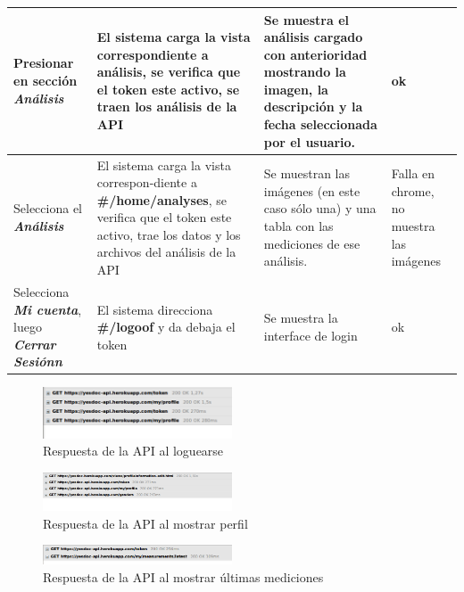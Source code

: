 \documentclass[a4paper,12pt]{article}
\begin{document}
\begin{longtable}{|p{4cm}|p{4cm}|p{4cm}|p{3cm}|}
Presionar en sección \textit{\textbf{Análisis }} 
& El sistema carga la vista correspondiente a análisis, se verifica que el token este activo, se traen los análisis de la API
& Se muestra el análisis cargado con anterioridad mostrando la imagen, la descripción y la fecha seleccionada por el usuario.
& ok
\\ \hline






Selecciona el \textit{\textbf{Análisis}}
& El sistema carga la vista correspon-diente a \textbf{ \#/home/analyses}, se verifica que el token este activo, trae los datos y los archivos del análisis de la API
& Se muestran las imágenes (en este caso sólo una) y una tabla con las mediciones de ese análisis.
& Falla en chrome, no muestra las imágenes
\\ \hline




Selecciona \textit{\textbf{Mi cuenta}}, luego \textit{\textbf{Cerrar Sesiónn}}
& El sistema direcciona \textbf{\#/logoof }y da debaja el token
& Se muestra la interface de login
& ok
\\ \hline


\end{longtable}







    \begin{figure}[h]
        \centering
        \includegraphics[width=0.5\textwidth]{img/5-login}
        \caption{Respuesta de la API al loguearse}
		\label{5-login}
    \end{figure}
    
        \begin{figure}[h]
        \centering
        \includegraphics[width=0.5\textwidth]{img/5-perfil}
        \caption{Respuesta de la API al mostrar perfil}
		\label{5-perfil}
    \end{figure}
    
        \begin{figure}[h]
        \centering
        \includegraphics[width=0.5\textwidth]{img/5-resumen}
        \caption{Respuesta de la API al mostrar últimas mediciones}
		\label{5-resumen}
    \end{figure}
    
\end{document}

